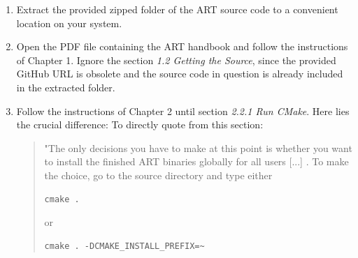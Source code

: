 \begin{enumerate}
	
	\item Extract the provided zipped folder of the ART source code to a convenient location on your system.
	
	\item Open the PDF file containing the ART handbook and follow the instructions of Chapter 1. Ignore the section \emph{1.2 Getting the Source}, since the provided GitHub URL is obsolete and the source code in question is already included in the extracted folder. 
	
	\item Follow the instructions of Chapter 2 until section \emph{2.2.1 Run CMake}. Here lies the crucial difference:
	To directly quote from this section: 
	\begin{quote}
	"The  only  decisions  you  have  to  make  at  this  point  is  whether  you  want  to  install  the  finished  ART binaries globally for all users [...] . To make the choice, go to the source directory and type either 
\begin{Verbatim}
cmake .
\end{Verbatim}
	or
\begin{Verbatim}
cmake . -DCMAKE_INSTALL_PREFIX=~
\end{Verbatim}
	\end{quote}
	

\end{enumerate}
